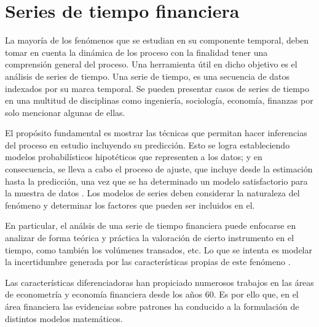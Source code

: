 \section{Series de tiempo financiera}

La mayoría de los fenómenos que se estudian en su componente temporal, deben tomar en cuenta la dinámica de los proceso con la finalidad tener una 
comprensión general del proceso. Una herramienta útil en dicho objetivo es el análisis de series de tiempo. Una serie de tiempo, es una secuencia de datos indexados por su marca 
temporal. Se pueden presentar casos de series de tiempo en una multitud de disciplinas como ingeniería, sociología, economía, finanzas por solo mencionar algunas de ellas.

El propósito fundamental es mostrar las técnicas que permitan hacer inferencias del proceso en estudio incluyendo su predicción. Esto se logra estableciendo modelos
probabilísticos hipotéticos que representen a los datos; y en consecuencia, se lleva a cabo el proceso de ajuste, que incluye desde la estimación hasta la 
predicción, una vez que se ha determinado un modelo satisfactorio para la muestra de datos \cite{box2011time} \cite{vandaele1983applied}. Los modelos de series deben considerar 
la naturaleza del fenómeno y determinar los factores que pueden ser incluidos en el.

En particular, el análsis de una serie de tiempo financiera puede enfocarse en analizar de forma teórica y práctica la valoración de cierto instrumento en el tiempo,
como también los volúmenes transados, etc. Lo que se intenta es modelar la incertidumbre generada por las características propias de este fenómeno \cite{tsay2005analysis}. 


Las características diferenciadoras han propiciado numerosos trabajos en las áreas de econometría y economía financiera desde los años 60. Es por ello que, en el área 
financiera las evidencias sobre patrones ha conducido a la formulación de distintos modelos matemáticos.


